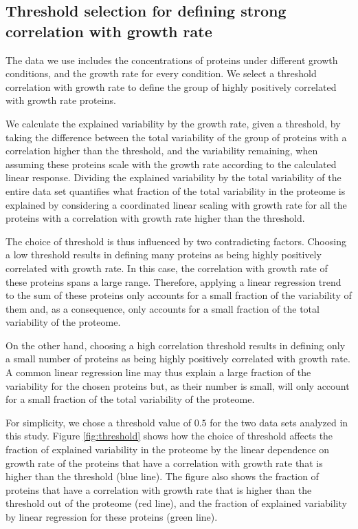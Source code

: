 \documentclass[a4paper]{article}
\begin{document}
\subsection{Threshold selection for defining strong correlation with growth rate}
\label{corrthreshold} 
The data we use includes the concentrations of proteins under different growth conditions, and the growth rate for every condition.
We select a threshold correlation with growth rate to define the group of highly positively correlated with growth rate proteins.

We calculate the explained variability by the growth rate, given a threshold, by taking the difference between the total variability of the group of proteins with a correlation higher than the threshold, and the variability remaining, when assuming these proteins scale with the growth rate according to the calculated linear response.
Dividing the explained variability by the total variability of the entire data set quantifies what fraction of the total variability in the proteome is explained by considering a coordinated linear scaling with growth rate for all the proteins with a correlation with growth rate higher than the threshold.

The choice of threshold is thus influenced by two contradicting factors.
Choosing a low threshold results in defining many proteins as being highly positively correlated with growth rate.
In this case, the correlation with growth rate of these proteins spans a large range.
Therefore, applying a linear regression trend to the sum of these proteins only accounts for a small fraction of the variability of them and, as a consequence, only accounts for a small fraction of the total variability of the proteome.

On the other hand, choosing a high correlation threshold results in defining only a small number of proteins as being highly positively correlated with growth rate.
A common linear regression line may thus explain a large fraction of the variability for the chosen proteins but, as their number is small, will only account for a small fraction of the total variability of the proteome.

For simplicity, we chose a threshold value of $0.5$ for the two data sets analyzed in this study.
Figure \ref{fig:threshold} shows how the choice of threshold affects the fraction of explained variability in the proteome by the linear dependence on growth rate of the proteins that have a correlation with growth rate that is higher than the threshold (blue line).
The figure also shows the fraction of proteins that have a correlation with growth rate that is higher than the threshold out of the proteome (red line), and the fraction of explained variability by linear regression for these proteins (green line).
\end{document}
